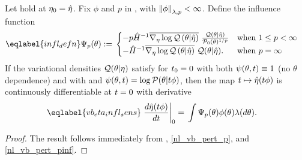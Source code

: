
\begin{cor}
%
Let  hold at $\eta_0 = \hat\eta$.
%
Fix $\phi$ and $p$ in , with $\left\Vert\phi\right\Vert_{\lambda,p} <
\infty$.  Define the influence function
%
\begin{align}\eqlabel{infl_defn}
%
\infl_p(\theta) :={}&
\begin{cases}
    - p \hessopt^{-1}
        \lqgradbar{\theta \vert \etaopt}
        \frac{\q(\theta \vert \etaopt)}{\pbase(\theta)^{1/p}}
& \textrm{when }1 \le p < \infty \\
%
    - \hessopt^{-1}
        \lqgradbar{\theta \vert \etaopt}
        \q(\theta \vert \etaopt).
& \textrm{when }p = \infty
%
\end{cases}
%
\end{align}
%
If the variational densities $\mathcal{Q}(\theta \vert \eta)$ satisfy
 for $t_0 = 0$ with both $\psi(\theta, t) \equiv 1$ (no
$\theta$ dependence) and with and $\psi(\theta, t) = \log \mathcal{P}(\theta \vert t
\phi)$, then the map $t \mapsto \hat\eta(t \phi)$ is continuously
differentiable at $t=0$ with derivative
%
\begin{align}\eqlabel{vb_eta_infl_sens}
%
\fracat{d \etaopt(\t \phi)}{d \t}{0} ={}&
    \int \infl_p(\theta) \phi(\theta) \lambda(d\theta).
%
\end{align}
%
\begin{proof}
%
The result follows immediately from , \eqref{nl_vb_pert_p},
and \eqref{nl_vb_pert_pinf}.
%
\end{proof}
%
\end{cor}


